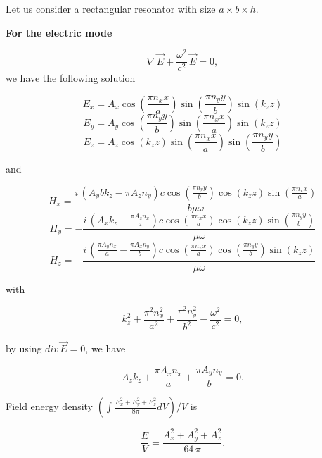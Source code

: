 \documentclass[twoside, 10pt]{article}
\begin{document}
\begin{multicols}{2}

\setcounter{equation}{0}
\renewcommand{\theequation}{B.\arabic{equation}}

    Let us consider a rectangular resonator with size \(a \times b \times h\).

    \textbf{For the electric mode}

\begin{equation}\nabla\,\vec{E} + \frac{\omega^2}{c^2}\,\vec{E} = 0,\end{equation} we have the
following solution

\[E_{x} = A_{x} \cos\left(\frac{\pi n_{x} x}{a}\right) \sin\left(\frac{\pi n_{y} y}{b}\right) \sin\left(k_{z} z\right)\]
\[E_{y} = A_{y} \cos\left(\frac{\pi n_{y} y}{b}\right) \sin\left(\frac{\pi n_{x} x}{a}\right) \sin\left(k_{z} z\right)\]
\[E_{z} = A_{z} \cos\left(k_{z} z\right) \sin\left(\frac{\pi n_{x} x}{a}\right) \sin\left(\frac{\pi n_{y} y}{b}\right)\]

and

\[H_{x} = \frac{i \, {\left(A_{y} b k_{z} - \pi A_{z} n_{y}\right)} c \cos\left(\frac{\pi n_{y} y}{b}\right) \cos\left(k_{z} z\right) \sin\left(\frac{\pi n_{x} x}{a}\right)}{b \mu \omega}\]
\[H_{y} = -\frac{i \, {\left(A_{x} k_{z} - \frac{\pi A_{z} n_{x}}{a}\right)} c \cos\left(\frac{\pi n_{x} x}{a}\right) \cos\left(k_{z} z\right) \sin\left(\frac{\pi n_{y} y}{b}\right)}{\mu \omega}\]
\[H_{z} = -\frac{i \, {\left(\frac{\pi A_{y} n_{x}}{a} - \frac{\pi A_{x} n_{y}}{b}\right)} c \cos\left(\frac{\pi n_{x} x}{a}\right) \cos\left(\frac{\pi n_{y} y}{b}\right) \sin\left(k_{z} z\right)}{\mu \omega}\]

with

\begin{equation}k_{z}^{2} + \frac{\pi^{2} n_{x}^{2}}{a^{2}} + \frac{\pi^{2} n_{y}^{2}}{b^{2}} - \frac{\omega^{2}}{c^{2}} = 0,\end{equation}

by using \(div\,\vec{E} = 0\), we have

\begin{equation}A_{z} k_{z} + \frac{\pi A_{x} n_{x}}{a} + \frac{\pi A_{y} n_{y}}{b} = 0.\end{equation}

Field energy density
\(\left(\int \frac{E_x^2+E_y^2+E_z^2}{8 \pi}dV\right)\big/{V}\) is

\begin{equation}\frac{E}{V} = \frac{{A_{x}^{2} + A_{y}^{2} + A_{z}^{2}} }{64 \, \pi}.\end{equation}


\end{multicols}
\end{document}
